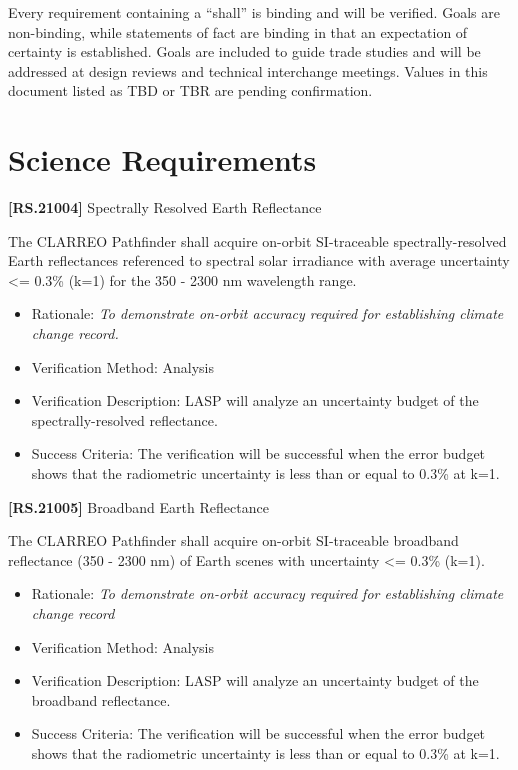 Every requirement containing a ``shall'' is binding and will be verified. Goals are non-binding, while statements of fact are binding in that an expectation of certainty is established. Goals are included to guide trade studies and will be addressed at design reviews and technical interchange meetings. Values in this document listed as TBD or TBR are pending confirmation.

\section{Science Requirements}
\label{sciencerequirements}

\textbf{[RS.21004]} Spectrally Resolved Earth Reflectance

The \gls{CLARREO} Pathfinder shall acquire on-orbit \gls{SI}-traceable spectrally-resolved Earth reflectances referenced to spectral solar irradiance with average uncertainty <= 0.3\% (k=1) for the 350 - 2300 nm wavelength range.

\begin{itemize}
\item{} Rationale: \emph{To demonstrate on-orbit accuracy required for establishing climate change record.}

\item{} Verification Method: Analysis

\item{} Verification Description: \gls{LASP} will analyze an uncertainty budget of the spectrally-resolved reflectance.

\item{} Success Criteria: The verification will be successful when the error budget shows that the radiometric uncertainty is less than or equal to 0.3\% at k=1.

\end{itemize}

\textbf{[RS.21005]} Broadband Earth Reflectance

The \gls{CLARREO} Pathfinder shall acquire on-orbit \gls{SI}-traceable broadband reflectance (350 - 2300 nm) of Earth scenes with uncertainty <= 0.3\% (k=1).

\begin{itemize}
\item{} Rationale: \emph{To demonstrate on-orbit accuracy required for establishing climate change record}

\item{} Verification Method: Analysis

\item{} Verification Description: \gls{LASP} will analyze an uncertainty budget of the broadband reflectance.

\item{} Success Criteria: The verification will be successful when the error budget shows that the radiometric uncertainty is less than or equal to 0.3\% at k=1.

\end{itemize}

